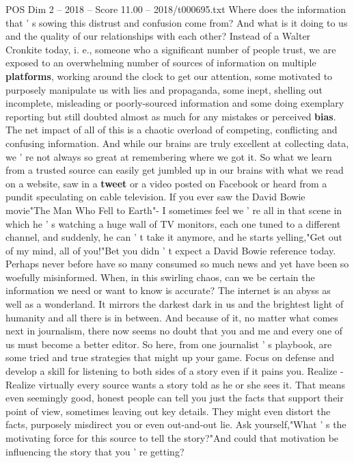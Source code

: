 \begin{textsample}{POS Dim 2 – 2018 – Score 11.00 – 2018/t000695.txt}
Where does the information that ' s sowing this distrust and confusion come from?
And what is it doing to us and the quality of our relationships with each other?
Instead of a Walter Cronkite today, i. e., someone who a significant number of people trust, we are exposed to an overwhelming number of sources of information on multiple \textbf{platforms}, working around the clock to get our attention, some motivated to purposely manipulate us with lies and propaganda, some inept, shelling out incomplete, misleading or poorly-sourced information and some doing exemplary reporting but still doubted almost as much for any mistakes or perceived \textbf{bias}.
The net impact of all of this is a chaotic overload of competing, conflicting and confusing information.
And while our brains are truly excellent at collecting data, we ' re not always so great at remembering where we got it.
So what we learn from a trusted source can easily get jumbled up in our brains with what we read on a website, saw in a \textbf{tweet} or a video posted on Facebook or heard from a pundit speculating on cable television.
If you ever saw the David Bowie movie"The Man Who Fell to Earth"- I sometimes feel we ' re all in that scene in which he ' s watching a huge wall of TV monitors, each one tuned to a different channel, and suddenly, he can ' t take it anymore, and he starts yelling,"Get out of my mind, all of you!"Bet you didn ' t expect a David Bowie reference today.
Perhaps never before have so many consumed so much news and yet have been so woefully misinformed.
When, in this swirling chaos, can we be certain the information we need or want to know is accurate?
The internet is an abyss as well as a wonderland.
It mirrors the darkest dark in us and the brightest light of humanity and all there is in between.
And because of it, no matter what comes next in journalism, there now seems no doubt that you and me and every one of us must become a better editor.
So here, from one journalist ' s playbook, are some tried and true strategies that might up your game.
Focus on defense and develop a skill for listening to both sides of a story even if it pains you.
Realize - Realize virtually every source wants a story told as he or she sees it.
That means even seemingly good, honest people can tell you just the facts that support their point of view, sometimes leaving out key details.
They might even distort the facts, purposely misdirect you or even out-and-out lie.
Ask yourself,"What ' s the motivating force for this source to tell the story?"And could that motivation be influencing the story that you ' re getting?

\end{textsample}
